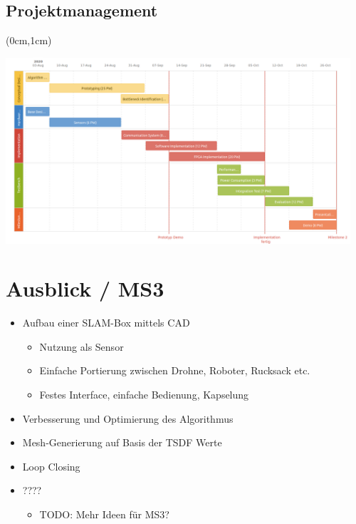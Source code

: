 \documentclass{beamer}
\begin{document}
\subsection{Projektmanagement}
\begin{frame}{\subsecname}
\begin{textblock*}{12.7cm}(0cm,1cm)
\begin{center}
\includegraphics[height=6.9cm]{images/roadmap.png}
\end{center}
\end{textblock*}

\end{frame}

\section{Ausblick / MS3}
\begin{frame}{\secname}
\begin{itemize}
\item{Aufbau einer SLAM-Box mittels CAD}
\begin{itemize}
\item{Nutzung als Sensor}
\item{Einfache Portierung zwischen Drohne, Roboter, Rucksack etc.}
\item{Festes Interface, einfache Bedienung, Kapselung}
\end{itemize}
\item{Verbesserung und Optimierung des Algorithmus}
\item{Mesh-Generierung auf Basis der TSDF Werte}
\item{Loop Closing}
\item{????}
\begin{itemize}
    \item{TODO: Mehr Ideen für MS3?}
\end{itemize}

\end{itemize}
\end{frame}
\end{document}
